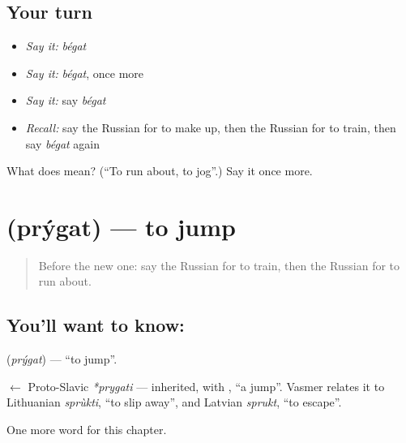 \subsection*{Your turn}
\begin{itemize}
\raggedright
  \item \emph{Say it:} \emph{bégat}
  \item \emph{Say it:} \emph{bégat}, once more
  \item \emph{Say it:} say \emph{bégat}
  \item \emph{Recall:} say the Russian for to make up, then the Russian for to train, then say \emph{bégat} again
\end{itemize}

\begin{tcolorbox}[breakable,colback=teal!4,colframe=teal!35!black,title={Before you move on}]
What does  mean? (\textquotedblleft{}To run about, to jog\textquotedblright{}.) Say it once more.
\end{tcolorbox}
\section[\texorpdfstring{\ru{прыгать} (prýgat)}{прыгать (prýgat)}]{ (prýgat) — to jump}

\label{lesson:RU-C178-prygat}



\begin{quote}
Before the new one: say the Russian for to train, then the Russian for to run about.
\end{quote}

\subsection*{You'll want to know: }
\textbf{} (\emph{prýgat}) — \textquotedblleft{}to jump\textquotedblright{}.

\begin{cousinweb}
\textbf{} $\leftarrow$ Proto-Slavic \emph{*prygati} — inherited, with \emph{}, \textquotedblleft{}a jump\textquotedblright{}. Vasmer relates it to Lithuanian \emph{sprùkti}, \textquotedblleft{}to slip away\textquotedblright{}, and Latvian \emph{sprukt}, \textquotedblleft{}to escape\textquotedblright{}.
\end{cousinweb}

\begin{grammarlens}[title={What you've built}]
One more word for this chapter.
\end{grammarlens}

